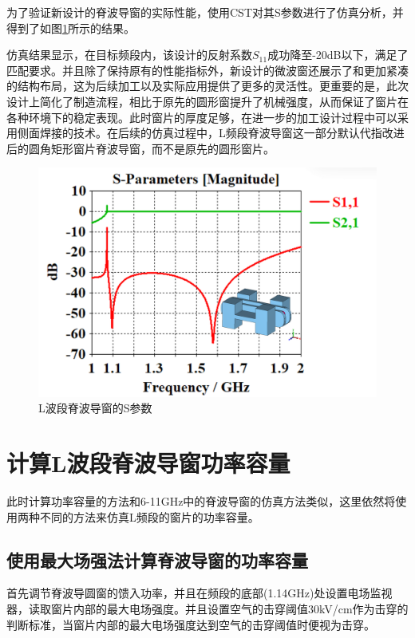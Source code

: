 \documentclass[master]{thesis-uestc}
\begin{document}
为了验证新设计的脊波导窗的实际性能，使用CST对其S参数进行了仿真分析，并得到了如图\ref{fig:L波段脊波导窗的S参数}所示的结果。

仿真结果显示，在目标频段内，该设计的反射系数$S_{11}$成功降至-20dB以下，满足了匹配要求。并且除了保持原有的性能指标外，新设计的微波窗还展示了和更加紧凑的结构布局，这为后续加工以及实际应用提供了更多的灵活性。更重要的是，此次设计上简化了制造流程，相比于原先的圆形窗提升了机械强度，从而保证了窗片在各种环境下的稳定表现。此时窗片的厚度足够，在进一步的加工设计过程中可以采用侧面焊接的技术。在后续的仿真过程中，L频段脊波导窗这一部分默认代指改进后的圆角矩形窗片脊波导窗，而不是原先的圆形窗片。

\begin{figure}[!htb]
    \centering
    \includegraphics[width=0.45\linewidth]{pic/chapter4/L波段脊波导窗S参数.png}
    \caption{L波段脊波导窗的S参数}
    \label{fig:L波段脊波导窗的S参数}
\end{figure}

\section{计算L波段脊波导窗功率容量}
此时计算功率容量的方法和6-11GHz中的脊波导窗的仿真方法类似，这里依然将使用两种不同的方法来仿真L频段的窗片的功率容量。

\subsection{使用最大场强法计算脊波导窗的功率容量}
首先调节脊波导圆窗的馈入功率，并且在频段的底部(1.14GHz)处设置电场监视器，读取窗片内部的最大电场强度。并且设置空气的击穿阈值30kV/cm作为击穿的判断标准，当窗片内部的最大电场强度达到空气的击穿阈值时便视为击穿。
\end{document}
